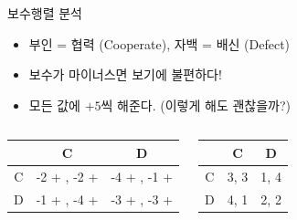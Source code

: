\documentclass[final]{beamer}
\begin{document}
\begin{frame}[t]{보수행렬 분석}
	\begin{itemize}
		\item 부인 = 협력 (Cooperate), 자백 = 배신 (Defect)
		\item 보수가 마이너스면 보기에 불편하다! 
		\item 모든 값에 $+5$씩 해준다. (이렇게 해도 괜찮을까?)
	\end{itemize}
	\vspace{1em}
	\begin{columns}[c]
		\column{15em}
		\begin{center}
			\begin{table}
				\begin{tabular}{|c|c|c|} \hline
					& {C} &  {D}\\ \hline
					{C} & {-2 + \color{red}{5}}, {-2 + \color{red}{5}} & {-4 + \color{red}{5}}, {-1 + \color{red}{5}} \\ \hline%
					{D} & {-1 + \color{red}{5}}, {-4 + \color{red}{5}}  & {-3 + \color{red}{5}}, {-3 + \color{red}{5}} \\ 
					\hline
				\end{tabular}
			\end{table}
		\end{center}
		\column{15em}
		\begin{center}
			\pause\begin{table}
				\begin{tabular}{|c|c|c|} \hline
					& {C} &  {D}\\ \hline
					{C} & {3}, {3} & {1}, {4} \\ \hline%
					{D} & {4}, {1}  & {2}, {2} \\ 
					\hline
				\end{tabular}
			\end{table}
		\end{center}
	\end{columns}
\end{frame}
\end{document}
